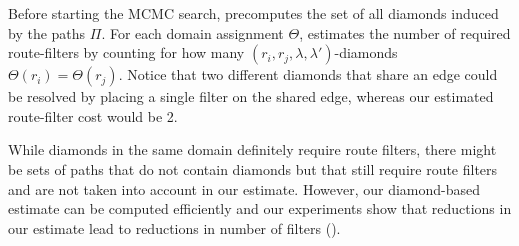 Before  starting the MCMC search, \name precomputes
the set of all diamonds induced by the paths $\Pi$. 
For each
domain assignment $\Theta$,
\name estimates the number  of required route-filters by counting for how many $(r_i, r_j, \lambda, \lambda')$-diamonds
$\Theta(r_i) = \Theta(r_j)$. 
Notice that two different diamonds that share an edge could be resolved
by placing a single filter on the shared edge, whereas our estimated route-filter cost 
would be 2. 

While diamonds in the same domain definitely require route filters, there might be
sets of paths that do not contain diamonds but that still require route filters
and are not
taken into account in our estimate. 
However, our diamond-based estimate
can be computed efficiently and 
our experiments show that reductions in our estimate
lead to reductions in number of filters (). 


